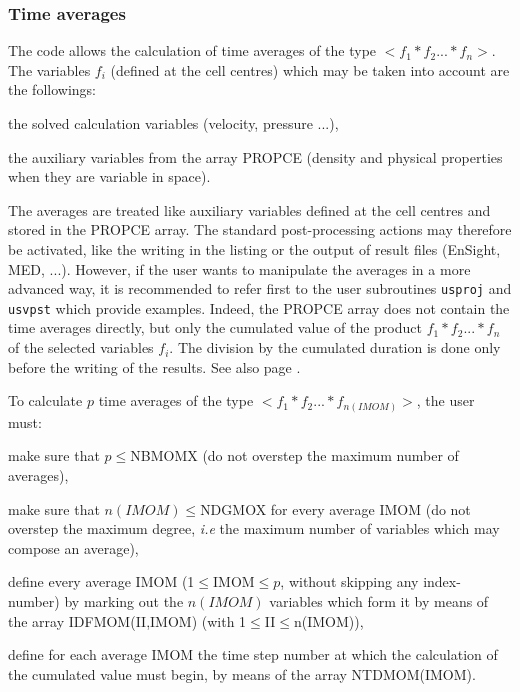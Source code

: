 \subsubsection{Time averages}

The code allows the calculation of time averages of the type
$<f_1*f_2...*f_n>$. The variables $f_i$ (defined at the cell centres)
which may be taken into account are the followings:
\begin{list}{-}{}
\item the solved calculation variables (velocity, pressure ...),
\item the auxiliary variables from the array PROPCE (density and
      physical properties when they are variable in space).
\end{list}

The averages are treated like auxiliary variables defined at the cell
centres and stored in the PROPCE array. The standard post-processing
actions may therefore be activated, like the writing in the listing or
the output of result files (EnSight, MED, ...). However, if the user
wants to manipulate the averages in a more advanced way, it is
recommended to refer first to the user subroutines \texttt{usproj} and
\texttt{usvpst} which provide examples. Indeed, the PROPCE array 
does not contain the time averages directly, but only the cumulated value 
of the product $f_1*f_2...*f_n$ of the selected
variables $f_i$. The division by the cumulated duration is done only
before the writing of the results. See also page \pageref{prg_moyennes}. 

To calculate $p$ time averages of the type $<f_1*f_2...*f_{n(IMOM)}>$,
the user must:
\begin{list}{-}{}
\item make sure that $p\leqslant$NBMOMX (do not overstep the maximum
      number of averages),
\item make sure that $n(IMOM)\leqslant$NDGMOX for every average IMOM
       (do not overstep the maximum degree, {\it i.e} the maximum number
       of variables which may compose an average),
\item define every average IMOM (1$\leqslant$IMOM$\leqslant p$, without
      skipping any index-number) by marking out the $n(IMOM)$ variables
      which form it by means of the array IDFMOM(II,IMOM) (with
      1$\leqslant$II$\leqslant$n(IMOM)), 
\item define for each average IMOM the time step number at which the
      calculation of the cumulated value must begin, by means of the
      array NTDMOM(IMOM).
\end{list}

